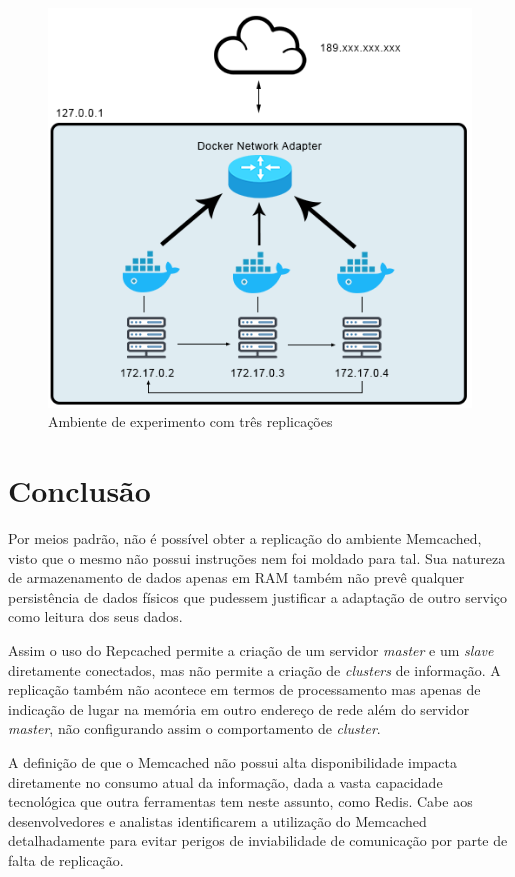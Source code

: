 \documentclass[conference]{IEEEtran}
\begin{document}
\begin{figure}[h!]
\centerline{\includegraphics[width=1\linewidth]{figura3.png}}
\caption{Ambiente de experimento com três replicações}
\label{fig}
\end{figure}

\section{Conclusão}

Por meios padrão, não é possível obter a replicação do ambiente Memcached, visto que o mesmo não possui instruções nem foi moldado para tal. Sua natureza de armazenamento de dados apenas em RAM também não prevê qualquer persistência de dados físicos que pudessem justificar a adaptação de outro serviço como leitura dos seus dados.

Assim o uso do Repcached permite a criação de um servidor \textit{master} e um \textit{slave} diretamente conectados, mas não permite a criação de \textit{clusters} de informação. A replicação também não acontece em termos de processamento mas apenas de indicação de lugar na memória em outro endereço de rede além do servidor \textit{master}, não configurando assim o comportamento de \textit{cluster}.

A definição de que o Memcached não possui alta disponibilidade impacta diretamente no consumo atual da informação, dada a vasta capacidade tecnológica que outra ferramentas tem neste assunto, como Redis. Cabe aos desenvolvedores e analistas identificarem a utilização do Memcached detalhadamente para evitar perigos de inviabilidade de comunicação por parte de falta de replicação.


\renewcommand{\refname}{Referências}

\end{document}
